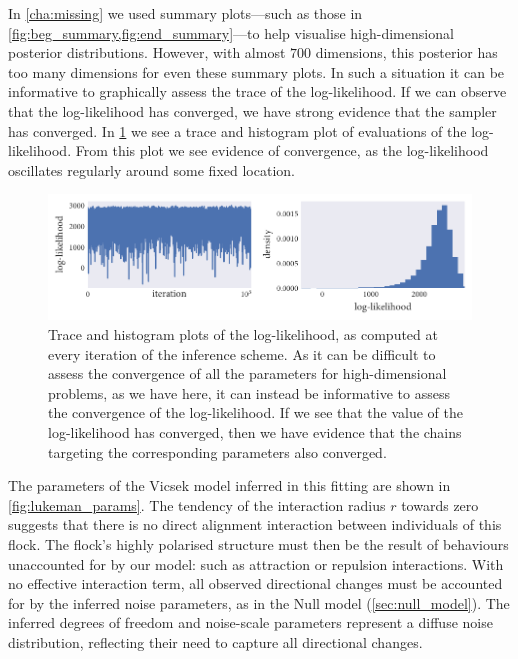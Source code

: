In \cref{cha:missing} we used summary plots---such as those in
\cref{fig:beg_summary,fig:end_summary}---to help visualise high-dimensional
posterior distributions. However, with almost $700$ dimensions, this posterior
has too many dimensions for even these summary plots. In such a situation it
can be informative to graphically assess the trace of the log-likelihood. If we
can observe that the log-likelihood has converged, we have strong evidence that
the sampler has converged. In \cref{fig:log_ll} we see a trace and histogram
plot of evaluations of the log-likelihood. From this plot we see evidence of
convergence, as the log-likelihood oscillates regularly around some fixed
location.

\begin{figure}[tb]
  \includegraphics{log_likelihood.pdf}
  \caption{Trace and histogram plots of the log-likelihood, as computed at
    every iteration of the inference scheme. As it can be difficult to assess
    the convergence of all the parameters for high-dimensional problems, as
    we have here, it can instead be informative to assess the convergence of
    the log-likelihood. If we see that the value of the log-likelihood has
    converged, then we have evidence that the chains targeting the corresponding
    parameters also converged.}
    \label{fig:log_ll}
\end{figure}

The parameters of the Vicsek model inferred in this fitting are shown in
\cref{fig:lukeman_params}. The tendency of the interaction radius $r$ towards
zero suggests that there is no direct alignment interaction between individuals
of this flock. The flock's highly polarised structure must then be the result
of behaviours unaccounted for by our model: such as attraction or repulsion
interactions. With no effective interaction term, all observed directional
changes must be accounted for by the inferred noise parameters, as in the Null
model (\cref{sec:null_model}). The inferred degrees of freedom and noise-scale
parameters represent a diffuse noise distribution, reflecting their need to
capture all directional changes.

